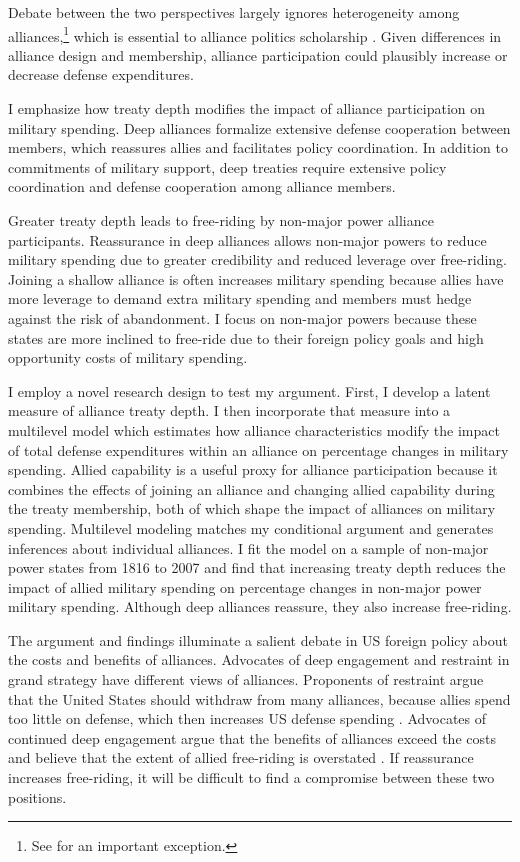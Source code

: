 \documentclass[12pt]{article}
\begin{document}
Debate between the two perspectives largely ignores heterogeneity among alliances,\footnote{See \citet{DigiuseppePoast2016} for an important exception.} which is essential to alliance politics scholarship \citep{Morrow1991, Leeds2003, LeedsAnac2005, Fordham2010, Mattes2012, Benson2012, Poast2013, Johnsonetal2015}.  
Given differences in alliance design and membership, alliance participation could plausibly increase or decrease defense expenditures. 


I emphasize how treaty depth modifies the impact of alliance participation on military spending. 
Deep alliances formalize extensive defense cooperation between members, which reassures allies and facilitates policy coordination. 
In addition to commitments of military support, deep treaties require extensive policy coordination and defense cooperation among alliance members. 


Greater treaty depth leads to free-riding by non-major power alliance participants. 
Reassurance in deep alliances allows non-major powers to reduce military spending due to greater credibility and reduced leverage over free-riding. 
Joining a shallow alliance is often increases military spending because allies have more leverage to demand extra military spending and members must hedge against the risk of abandonment.
I focus on non-major powers because these states are more inclined to free-ride due to their foreign policy goals and high opportunity costs of military spending.   
 

I employ a novel research design to test my argument.
First, I develop a latent measure of alliance treaty depth. 
I then incorporate that measure into a multilevel model which estimates how alliance characteristics modify the impact of total defense expenditures within an alliance on percentage changes in military spending.
Allied capability is a useful proxy for alliance participation because it combines the effects of joining an alliance and changing allied capability during the treaty membership, both of which shape the impact of alliances on military spending. 
Multilevel modeling matches my conditional argument and generates inferences about individual alliances. 
I fit the model on a sample of non-major power states from 1816 to 2007 and find that increasing treaty depth reduces the impact of allied military spending on percentage changes in non-major power military spending.
Although deep alliances reassure, they also increase free-riding. 


The argument and findings illuminate a salient debate in US foreign policy about the costs and benefits of alliances. 
Advocates of deep engagement \citep{Brooksetal2013} and restraint \citep{Posen2014} in grand strategy have different views of alliances. 
Proponents of restraint argue that the United States should withdraw from many alliances, because allies spend too little on defense, which then increases US defense spending \citep{Preble2009}.
Advocates of continued deep engagement argue that the benefits of alliances exceed the costs and believe that the extent of allied free-riding is overstated \citep{BrandsFeaver2017}. 
If reassurance increases free-riding, it will be difficult to find a compromise between these two positions.  
\end{document}
